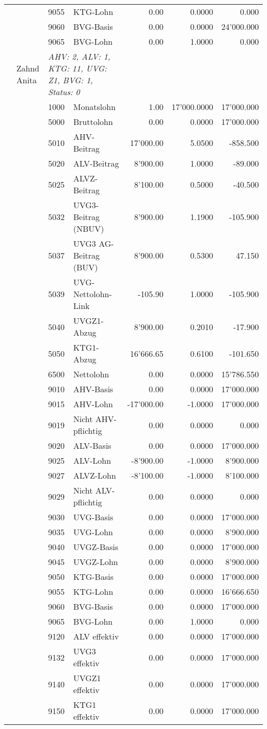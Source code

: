 \documentclass[15pt,a4paper]{article}
\begin{document}
\begin{longtable}{@{\extracolsep{\fill}}l l l l|r|r|r}
&&9055&KTG-Lohn&0.00&0.0000&0.000\\
&&9060&BVG-Basis&0.00&0.0000&24'000.000\\
&&9065&BVG-Lohn&0.00&1.0000&0.000\\
\pagebreak
27&Zahnd Anita&\multicolumn{2}{l|}{\small\emph{AHV: 2, ALV: 1, KTG: 11, UVG: Z1, BVG: 1, Status: 0}}&& \\
&&1000&Monatslohn&1.00&17'000.0000&17'000.000\\
&&5000&Bruttolohn&0.00&0.0000&17'000.000\\
&&5010&AHV-Beitrag&17'000.00&5.0500&-858.500\\
&&5020&ALV-Beitrag&8'900.00&1.0000&-89.000\\
&&5025&ALVZ-Beitrag&8'100.00&0.5000&-40.500\\
&&5032&UVG3-Beitrag (NBUV)&8'900.00&1.1900&-105.900\\
&&5037&UVG3 AG-Beitrag (BUV)&8'900.00&0.5300&47.150\\
&&5039&UVG-Nettolohn-Link&-105.90&1.0000&-105.900\\
&&5040&UVGZ1-Abzug&8'900.00&0.2010&-17.900\\
&&5050&KTG1-Abzug&16'666.65&0.6100&-101.650\\
&&6500&Nettolohn&0.00&0.0000&15'786.550\\
&&9010&AHV-Basis&0.00&0.0000&17'000.000\\
&&9015&AHV-Lohn&-17'000.00&-1.0000&17'000.000\\
&&9019&Nicht AHV-pflichtig&0.00&0.0000&0.000\\
&&9020&ALV-Basis&0.00&0.0000&17'000.000\\
&&9025&ALV-Lohn&-8'900.00&-1.0000&8'900.000\\
&&9027&ALVZ-Lohn&-8'100.00&-1.0000&8'100.000\\
&&9029&Nicht ALV-pflichtig&0.00&0.0000&0.000\\
&&9030&UVG-Basis&0.00&0.0000&17'000.000\\
&&9035&UVG-Lohn&0.00&0.0000&8'900.000\\
&&9040&UVGZ-Basis&0.00&0.0000&17'000.000\\
&&9045&UVGZ-Lohn&0.00&0.0000&8'900.000\\
&&9050&KTG-Basis&0.00&0.0000&17'000.000\\
&&9055&KTG-Lohn&0.00&0.0000&16'666.650\\
&&9060&BVG-Basis&0.00&0.0000&17'000.000\\
&&9065&BVG-Lohn&0.00&1.0000&0.000\\
&&9120&ALV effektiv&0.00&0.0000&17'000.000\\
&&9132&UVG3 effektiv&0.00&0.0000&17'000.000\\
&&9140&UVGZ1 effektiv&0.00&0.0000&17'000.000\\
&&9150&KTG1 effektiv&0.00&0.0000&17'000.000\\

\end{longtable}
\end{document}
